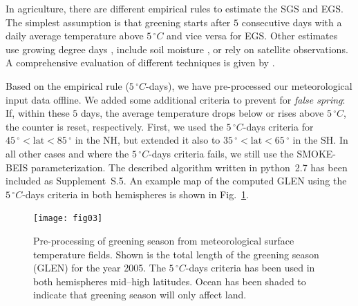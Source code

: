 \documentclass[gmd, manuscript]{copernicus}
\begin{document}
In agriculture, there are different empirical rules to estimate the SGS and EGS. The simplest assumption is that greening starts after $5$ consecutive days with a daily average temperature above $5\,\unit{^\circ C}$ and vice versa for EGS. Other estimates use growing degree days \citep{JC:Levis2004,PO:Fu2014}, include soil moisture \citep{GCB:Fu2014}, or rely on satellite observations. A comprehensive evaluation of different techniques is given by \citet{GCB:Anav2017}.

Based on the empirical rule ($5\,\unit{^\circ C}$-days), we have pre-processed our meteorological input data offline. We added some additional criteria to prevent for \emph{false spring}: If, within these $5$ days, the average temperature drops below or rises above $5\,\unit{^\circ C}$, the counter is reset, respectively. First, we used the $5\,\unit{^\circ C}$-days criteria for $45\,\unit{^\circ} < \text{lat} < 85\,\unit{^\circ}$ in the NH, but extended it also to $35\,\unit{^\circ} < \text{lat} < 65\,\unit{^\circ}$ in the SH. In all other cases and where the $5\,\unit{^\circ C}$-days criteria fails, we still use the SMOKE-BEIS parameterization. The described algorithm written in python~2.7 has been included as Supplement~S.5. An example map of the computed GLEN using the $5\,\unit{^\circ C}$-days criteria in both hemispheres is shown in Fig.~\ref{fig:glen_2015_she}.
%
\begin{figure}[t]
  \texttt{[image: fig03]}
  \caption{Pre-processing of greening season from meteorological surface temperature fields. Shown is the total length of the greening season (GLEN) for the year 2005. The $5\,\unit{^\circ C}$-days criteria has been used in both hemispheres mid--high latitudes. Ocean has been shaded to indicate that greening season will only affect land.}
  \label{fig:glen_2015_she}
\end{figure}
%
\end{document}
